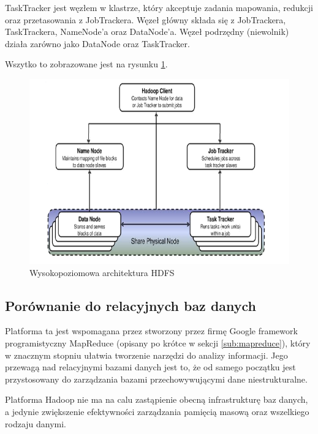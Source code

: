 \documentclass[twocolumn]{svjour3}          %
\begin{document}
TaskTracker jest węzłem w klastrze, który akceptuje zadania mapowania, redukcji oraz przetasowania z JobTrackera. Węzeł główny składa się z JobTrackera, TaskTrackera, NameNode'a oraz DataNode'a. Węzeł podrzędny (niewolnik) działa zarówno jako DataNode oraz TaskTracker.

Wszytko to zobrazowane jest na rysunku \ref{fig:hdfs_hight_level_architecture}.

\begin{figure}
    \centerline{\includegraphics[scale=0.4]{obrazki/wysokopoziomowa_architektura_hadoop.png}}
    \caption{Wysokopoziomowa architektura HDFS}
    \label{fig:hdfs_hight_level_architecture}       %
\end{figure}


\subsection{Porównanie do relacyjnych baz danych}
\label{ssub:porownanie_z_relacyjnymi}
Platforma ta jest wspomagana przez stworzony przez firmę Google framework programistyczny MapReduce (opisany po krótce w sekcji \ref{sub:mapreduce}), który w znacznym stopniu ułatwia tworzenie narzędzi do analizy informacji. Jego przewagą nad relacyjnymi bazami danych jest to, że od samego początku jest przystosowany do zarządzania bazami przechowywującymi dane niestrukturalne.

Platforma Hadoop nie ma na calu zastąpienie obecną infrastrukturę baz danych, a jedynie zwiększenie efektywności zarządzania pamięcią masową oraz wszelkiego rodzaju danymi.
\end{document}
